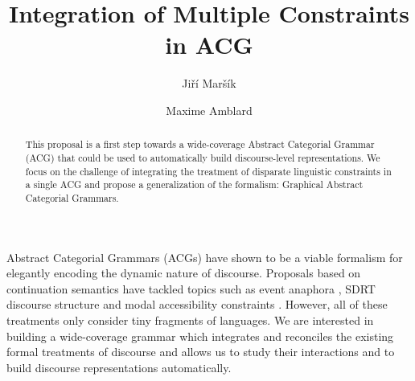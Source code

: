 \documentclass{llncs}
\begin{document}
%
\frontmatter          %
%
\pagestyle{headings}  %

\mainmatter              %
%
\title{Integration of Multiple Constraints in ACG}
%
%
\author{Jiří Maršík \and Maxime Amblard}
%
%
%

\maketitle              %

\begin{abstract}
This proposal is a first step towards a wide-coverage Abstract Categorial
Grammar (ACG) that could be used to automatically build discourse-level
representations. We focus on the challenge of integrating the treatment of
disparate linguistic constraints in a single ACG and propose a generalization
of the formalism: Graphical Abstract Categorial Grammars.
\end{abstract}

Abstract Categorial Grammars (ACGs) \cite{de2001towards} have shown to be a
viable formalism for elegantly encoding the dynamic nature of
discourse. Proposals based on continuation semantics \cite{de2006towards} have
tackled topics such as event anaphora \cite{qian2011event}, SDRT discourse
structure \cite{asher2011sdrt} and modal accessibility constraints
\cite{asher2011montagovian}. However, all of these treatments only consider
tiny fragments of languages. We are interested in building a wide-coverage
grammar which integrates and reconciles the existing formal treatments of
discourse and allows us to study their interactions and to build discourse
representations automatically.
\end{document}
